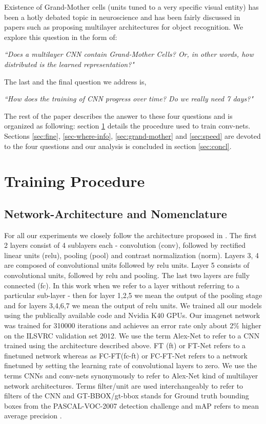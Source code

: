 \documentclass[runningheads]{llncs}
\begin{document}
Existence of Grand-Mother cells (units tuned to a very specific visual entity)  has been a hotly debated topic in neuroscience \cite{Grandmother} and has been fairly discussed in papers such as \cite{GoogleCat} proposing multilayer architectures for object recognition. We explore this question in the form of: 
\begin{center}
\textit{``Does a multilayer CNN contain Grand-Mother Cells? Or, in other words, how distributed is the learned representation?" }
\end{center}
The last and the final question we address is,
\begin{center}
\textit{``How does the training of CNN progress over time? Do we really need 7 days?"}
\end{center}

The rest of the paper describes the answer to these four questions and is organized as following: section \ref{sec:train} details the procedure used to train conv-nets.  Sections \ref{sec:fine}, \ref{sec-where-info}, \ref{sec:grand-mother} and \ref{sec:speed} are devoted to the four questions and our analysis is concluded in section \ref{sec:concl}.
\section{Training Procedure}
\label{sec:train}
\subsection{Network-Architecture and Nomenclature}
\label{sub:net-arch}
For all our experiments we closely follow the architecture proposed in \cite{Kriz}. The first 2 layers consist of 4 sublayers each - convolution (conv), followed by rectified linear units (relu), pooling (pool) and contrast normalization (norm). Layers 3, 4 are composed of convolutional units followed by relu units. Layer 5 consists of convolutional units, followed by relu and pooling. The last two layers are fully connected (fc). In this work when we refer to a layer without referring to a particular sub-layer - then for layer 1,2,5 we mean the output of the pooling stage and for layers 3,4,6,7 we mean the output of relu units. We trained all our models using the publically available code \cite{caffe} and Nvidia K40 GPUs. Our imagenet network was trained for 310000 iterations and achieves an error rate only about 2\% higher on the ILSVRC validation set 2012. \newline
We use the term Alex-Net to refer to a CNN trained using the architecture described above. FT (ft) or FT-Net refers to a finetuned network whereas as FC-FT(fc-ft) or FC-FT-Net refers to a network finetuned by setting the learning rate of convolutional layers to zero. We use the terms CNNs and conv-nets synonymously to refer to Alex-Net kind of multilayer network architectures. Terms filter/unit are used interchangeably to refer to filters of the CNN and GT-BBOX/gt-bbox stands for Ground truth bounding boxes from the PASCAL-VOC-2007 detection challenge and mAP refers to mean average precision \cite{Pascal}.
\end{document}
